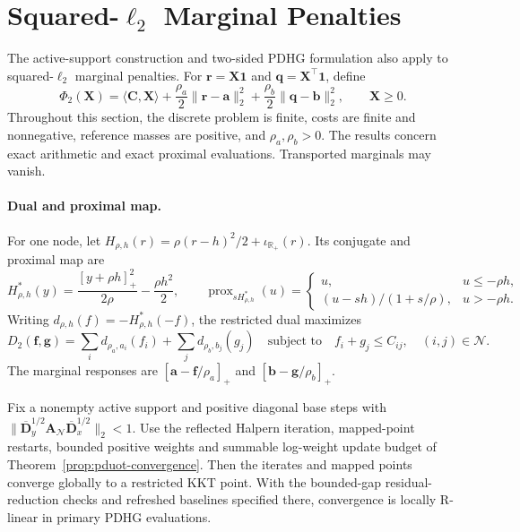 \section{Squared-$\ell_2$ Marginal Penalties}
\label{app:l2-penalty}

The active-support construction and two-sided PDHG formulation also apply to squared-$\ell_2$ marginal penalties.
For $\mathbf r=\mathbf X\mathbf1$ and $\mathbf q=\mathbf X^\top\mathbf1$, define
\begin{equation*}
\Phi_2(\mathbf X)=\langle\mathbf C,\mathbf X\rangle+\frac{\rho_a}{2}\|\mathbf r-\mathbf a\|_2^2+\frac{\rho_b}{2}\|\mathbf q-\mathbf b\|_2^2,\qquad \mathbf X\geq0.
\end{equation*}
Throughout this section, the discrete problem is finite, costs are finite and nonnegative, reference masses are positive, and $\rho_a,\rho_b>0$.
The results concern exact arithmetic and exact proximal evaluations.
Transported marginals may vanish.

\paragraph{Dual and proximal map.}
For one node, let $H_{\rho,h}(r)=\rho(r-h)^2/2+\iota_{\mathbb R_+}(r)$.
Its conjugate and proximal map are
\begin{equation*}
H_{\rho,h}^*(y)=\frac{[y+\rho h]_+^2}{2\rho}-\frac{\rho h^2}{2},\qquad
\operatorname{prox}_{sH_{\rho,h}^*}(u)=
\begin{cases}
u,&u\leq-\rho h,\\
(u-sh)/(1+s/\rho),&u>-\rho h.
\end{cases}
\end{equation*}
Writing $d_{\rho,h}(f)=-H_{\rho,h}^*(-f)$, the restricted dual maximizes
\begin{equation*}
D_2(\mathbf f,\mathbf g)=\sum_i d_{\rho_a,a_i}(f_i)+\sum_j d_{\rho_b,b_j}(g_j)
\quad\text{subject to}\quad f_i+g_j\leq C_{ij},\quad(i,j)\in\mathcal N.
\end{equation*}
The marginal responses are $[\mathbf a-\mathbf f/\rho_a]_+$ and $[\mathbf b-\mathbf g/\rho_b]_+$.

\begin{theorem}
\label{thm:l2-pduot}
Fix a nonempty active support and positive diagonal base steps with $\|\overline{\mathbf D}_y^{1/2}\mathbf A_{\mathcal N}\overline{\mathbf D}_x^{1/2}\|_2<1$.
Use the reflected Halpern iteration, mapped-point restarts, bounded positive weights and summable log-weight update budget of Theorem~\ref{prop:pduot-convergence}.
Then the iterates and mapped points converge globally to a restricted KKT point.
With the bounded-gap residual-reduction checks and refreshed baselines specified there, convergence is locally R-linear in primary PDHG evaluations.
\end{theorem}


